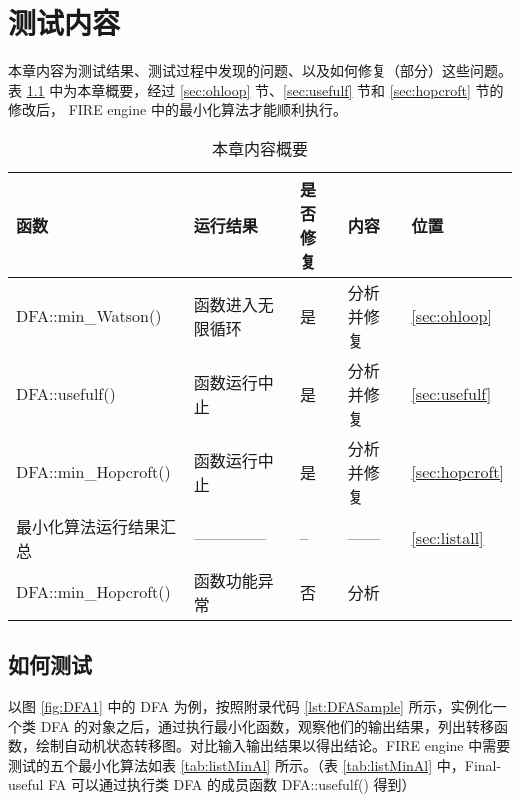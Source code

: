 \chapter{测试内容}\label{cha:realwork}

本章内容为测试结果、测试过程中发现的问题、以及如何修复（部分）这些问题。表 \ref{tab:testerrorlist} 中为本章概要，经过 \ref{sec:ohloop} 节、\ref{sec:usefulf} 节和 \ref{sec:hopcroft} 节的修改后， FIRE engine 中的最小化算法才能顺利执行。

\begin{table}[!htbp]
    \caption{本章内容概要}
    \label{tab:testerrorlist}
    \centering
    \small%
    \setlength{\tabcolsep}{6pt}%
    \renewcommand{\arraystretch}{1.2}%
        \begin{tabular}{l l p{4em}<{\centering} p{5em}<{\centering} p{3em}<{\centering}}
        \toprule %
        函数 & 运行结果 & 是否修复 & 内容 & 位置 \\
        \midrule%
        DFA::min\_Watson() & 函数进入无限循环 & 是 & 分析并修复  & \ref{sec:ohloop} \\
        DFA::usefulf()     & 函数运行中止     & 是 & 分析并修复  & \ref{sec:usefulf} \\
        DFA::min\_Hopcroft() & 函数运行中止   & 是 & 分析并修复  & \ref{sec:hopcroft} \\
        最小化算法运行结果汇总   & --------------   & -- & ------ & \ref{sec:listall}  \\
        DFA::min\_Hopcroft()& 函数功能异常   & 否 & 分析       &   \\
        \bottomrule%
    \end{tabular}
\end{table}

\section{如何测试}

以图 \ref{fig:DFA1} 中的 DFA 为例，按照附录代码 \ref{lst:DFASample} 所示，实例化一个类 DFA 的对象之后，通过执行最小化函数，观察他们的输出结果，列出转移函数，绘制自动机状态转移图。对比输入输出结果以得出结论。FIRE engine 中需要测试的五个最小化算法如表 \ref{tab:listMinAl} 所示。（表 \ref{tab:listMinAl} 中，Final-useful FA 可以通过执行类 DFA 的成员函数 DFA::usefulf() 得到）

